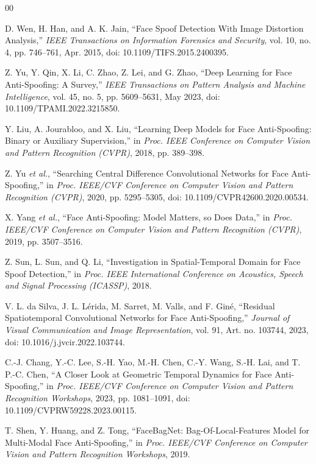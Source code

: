 \documentclass[a4paper,conference]{IEEEtran}
\begin{document}
\begin{thebibliography}{00}

D. Wen, H. Han, and A. K. Jain, ``Face Spoof Detection With Image Distortion Analysis,'' \emph{IEEE Transactions on Information Forensics and Security}, vol. 10, no. 4, pp. 746--761, Apr. 2015, doi: 10.1109/TIFS.2015.2400395.

Z. Yu, Y. Qin, X. Li, C. Zhao, Z. Lei, and G. Zhao, ``Deep Learning for Face Anti-Spoofing: A Survey,'' \emph{IEEE Transactions on Pattern Analysis and Machine Intelligence}, vol. 45, no. 5, pp. 5609--5631, May 2023, doi: 10.1109/TPAMI.2022.3215850.

Y. Liu, A. Jourabloo, and X. Liu, ``Learning Deep Models for Face Anti-Spoofing: Binary or Auxiliary Supervision,'' in \emph{Proc. IEEE Conference on Computer Vision and Pattern Recognition (CVPR)}, 2018, pp. 389--398.

Z. Yu \emph{et al.}, ``Searching Central Difference Convolutional Networks for Face Anti-Spoofing,'' in \emph{Proc. IEEE/CVF Conference on Computer Vision and Pattern Recognition (CVPR)}, 2020, pp. 5295--5305, doi: 10.1109/CVPR42600.2020.00534.

X. Yang \emph{et al.}, ``Face Anti-Spoofing: Model Matters, so Does Data,'' in \emph{Proc. IEEE/CVF Conference on Computer Vision and Pattern Recognition (CVPR)}, 2019, pp. 3507--3516.

Z. Sun, L. Sun, and Q. Li, ``Investigation in Spatial-Temporal Domain for Face Spoof Detection,'' in \emph{Proc. IEEE International Conference on Acoustics, Speech and Signal Processing (ICASSP)}, 2018.

V. L. da Silva, J. L. L\'erida, M. Sarret, M. Valls, and F. Gin\'e, ``Residual Spatiotemporal Convolutional Networks for Face Anti-Spoofing,'' \emph{Journal of Visual Communication and Image Representation}, vol. 91, Art. no. 103744, 2023, doi: 10.1016/j.jvcir.2022.103744.

C.-J. Chang, Y.-C. Lee, S.-H. Yao, M.-H. Chen, C.-Y. Wang, S.-H. Lai, and T. P.-C. Chen, ``A Closer Look at Geometric Temporal Dynamics for Face Anti-Spoofing,'' in \emph{Proc. IEEE/CVF Conference on Computer Vision and Pattern Recognition Workshops}, 2023, pp. 1081--1091, doi: 10.1109/CVPRW59228.2023.00115.

T. Shen, Y. Huang, and Z. Tong, ``FaceBagNet: Bag-Of-Local-Features Model for Multi-Modal Face Anti-Spoofing,'' in \emph{Proc. IEEE/CVF Conference on Computer Vision and Pattern Recognition Workshops}, 2019.


\end{thebibliography}
\end{document}
